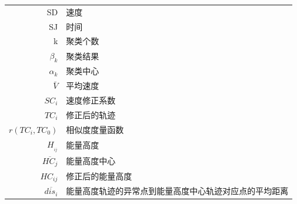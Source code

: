 \documentclass[GBK]{ctexart}
\begin{document}
\begin{spacing}{1.5}
\begin{table}[H]
\begin{tabular}{|r|l|}
    \rowcolor[rgb]{ .816,  .808,  .808}SD  & 速度 \\
     SJ& 时间 \\
    \rowcolor[rgb]{ .816,  .808,  .808}k& 聚类个数 \\
    ${\beta _k}$& 聚类结果 \\
    \rowcolor[rgb]{ .816,  .808,  .808}${\alpha _k}$& 聚类中心\\
    $\bar V$&平均速度\\
     \rowcolor[rgb]{ .816,  .808,  .808}$S{C_i}$&速度修正系数\\
    $T{C_i}$    & 修正后的轨迹 \\
    \rowcolor[rgb]{ .816,  .808,  .808}  $r(T{C_i},T{C_0})$& 相似度度量函数  \\
    ${H_{_{ij}}}$& 能量高度\\
    \rowcolor[rgb]{ .816,  .808,  .808}
    $\overline {H{C_j}}$&  能量高度中心\\
    $H{C_{ij}}$ & 修正后的能量高度 \\
   \rowcolor[rgb]{ .816,  .808,  .808}$\overline {di{s_i}}$    & 能量高度轨迹的异常点到能量高度中心轨迹对应点的平均距离\\

\end{tabular}
\end{table}
\end{spacing}
\end{document}
